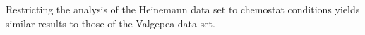 \label{fig:growthcorrchemo}
  Restricting the analysis of the Heinemann data set to chemostat conditions yields similar results to those of the Valgepea data set.
